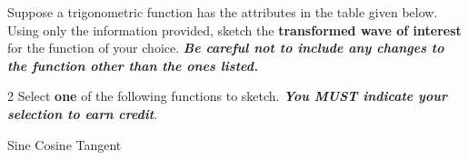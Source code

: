 \documentclass[11pt]{exam}
\begin{document}
\begin{questions}
\question[2]
Suppose a trigonometric function has the attributes in the table given below. Using only the information provided, sketch the \textbf{transformed wave of interest} for the function of your choice. \textit{\textbf{Be careful not to include any changes to the function other than the ones listed.}}

\begin{multicols}{2}
    Select \textbf{one} of the following functions to sketch. \textbf{\textit{You MUST indicate your selection to earn credit}}.
    \begin{checkboxes}
    \choice Sine   
    \choice Cosine    
    \choice Tangent
\end{checkboxes}

\columnbreak
{}
\end{multicols}


\end{questions}
\end{document}

